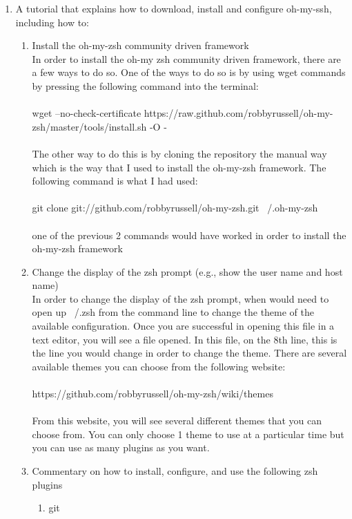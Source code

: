 \documentclass{article}
\begin{document}
\begin{enumerate}
\item A tutorial that explains how to download, install and configure oh-my-ssh, including how to:
\begin{enumerate}
\item Install the oh-my-zsh community driven framework
\\
In order to install the oh-my zsh community driven framework, there are a few ways to do so. One of the ways to do so is by using wget commands by pressing the following command into the terminal:
\\
\\
wget --no-check-certificate https://raw.github.com/robbyrussell/oh-my-zsh/master/tools/install.sh -O -
\\
\\
The other way to do this is by cloning the repository the manual way which is the way that I used to install the oh-my-zsh framework. The following command is what I had used:
\\
\\
git clone git://github.com/robbyrussell/oh-my-zsh.git ~/.oh-my-zsh
\\
\\
one of the previous 2 commands would have worked in order to install the oh-my-zsh framework
\\
\item Change the display of the zsh prompt (e.g., show the user name and host name)
\\
In order to change the display of the zsh prompt, when would need to open up ~/.zsh from the command line to change the theme of the available configuration. Once you are successful in opening this file in a text editor, you will see a file opened. In this file, on the 8th line, this is the line you would change in order to change the theme. There are several available themes you can choose from the following website:
\\
\\
https://github.com/robbyrussell/oh-my-zsh/wiki/themes
\\
\\
From this website, you will see several different themes that you can choose from. You can only choose 1 theme to use at a particular time but you can use as many plugins as you want.  
\item Commentary on how to install, configure, and use the following zsh plugins
\\
\begin{enumerate}
\item git

\end{enumerate}
\end{enumerate}
\end{enumerate}
\end{document}
